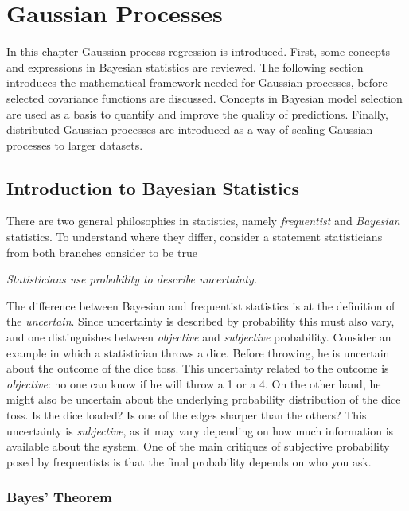 \documentclass[twoside,english]{uiofysmaster}
\begin{document}
\tableofcontents



\chapter{Gaussian Processes}

In this chapter Gaussian process regression is introduced. First, some concepts and expressions in Bayesian statistics are reviewed. The following section introduces the mathematical framework needed for Gaussian processes, before selected covariance functions are discussed. Concepts in Bayesian model selection are used as a basis to quantify and improve the quality of predictions. Finally, distributed Gaussian processes are introduced as a way of scaling Gaussian processes to larger datasets.

\section{Introduction to Bayesian Statistics}

There are two general philosophies in statistics, namely \textit{frequentist} and \textit{Bayesian} statistics. To understand where they differ, consider a statement statisticians from both branches consider to be true

\begin{center}
\textit{Statisticians use probability to describe uncertainty.}
\end{center}

The difference between Bayesian and frequentist statistics is at the definition of the \textit{uncertain}. Since uncertainty is described by probability this must also vary, and one distinguishes between \textit{objective} and \textit{subjective} probability. Consider an example in which a statistician throws a dice. Before throwing, he is uncertain about the outcome of the dice toss. This uncertainty related to the outcome is \textit{objective}: no one can know if he will throw a 1 or a 4. On the other hand, he might also be uncertain about the underlying probability distribution of the dice toss. Is the dice loaded? Is one of the edges sharper than the others? This uncertainty is \textit{subjective}, as it may vary depending on how much information is available about the system. One of the main critiques of subjective probability posed by frequentists is that the final probability depends on who you ask.

\subsection{Bayes' Theorem}
\end{document}
